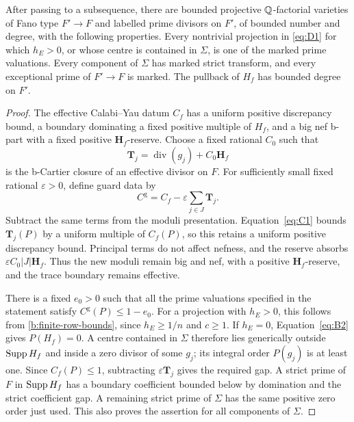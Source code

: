 \begin{lemma}\label{b:guard-model}
After passing to a subsequence, there are bounded projective
\(\mathbb Q\)-factorial varieties of Fano type \(F'\to F\) and labelled prime
divisors on \(F'\), of bounded number and degree, with the following
properties. Every nontrivial projection in \eqref{eq:D1} for which
\(h_E>0\), or whose centre is contained in \(\Sigma\), is one of the
marked prime valuations. Every component of \(\Sigma\) has marked strict
transform, and every exceptional prime of \(F'\to F\) is marked. The
pullback of \(H_f\) has bounded degree on \(F'\).
\end{lemma}

\begin{proof}
The effective Calabi--Yau datum \(C_f\) has a uniform positive discrepancy
bound, a boundary dominating a fixed positive multiple of \(H_f\), and a
big nef b-part with a fixed positive \(\mathbf H_f\)-reserve. Choose a
fixed rational \(C_0\) such that
\[
 \mathbf T_j=\operatorname{div}(g_j)+C_0\mathbf H_f
\]
is the b-Cartier closure of an effective divisor on \(F\). For sufficiently
small fixed rational \(\varepsilon>0\), define guard data by
\[
 C^{\mathrm g}=C_f-\varepsilon\sum_{j\in J}\mathbf T_j.
\]
Subtract the same terms from the moduli presentation. Equation~\eqref{eq:C1}
bounds \(\mathbf T_j(P)\) by a uniform multiple of \(C_f(P)\), so this
retains a uniform positive discrepancy bound. Principal terms do not affect
nefness, and the reserve absorbs \(\varepsilon C_0|J|\mathbf H_f\).
Thus the new moduli remain big and nef, with a positive
\(\mathbf H_f\)-reserve, and the trace boundary remains effective.

There is a fixed \(e_0>0\) such that all the prime valuations specified in
the statement satisfy \(C^{\mathrm g}(P)\leq1-e_0\). For a projection
with \(h_E>0\), this follows from \eqref{b:finite-row-bounds}, since
\(h_E\geq1/n\) and \(c\geq1\). If \(h_E=0\), Equation~\eqref{eq:B2}
gives \(P(H_f)=0\). A centre contained in \(\Sigma\) therefore lies
generically outside \(\operatorname{Supp} H_f\) and inside a zero divisor of some
\(g_j\); its integral order \(P(g_j)\) is at least one. Since
\(C_f(P)\leq1\), subtracting \(\varepsilon\mathbf T_j\) gives the
required gap. A strict prime of \(F\) in \(\operatorname{Supp} H_f\) has a boundary
coefficient bounded below by domination and the strict coefficient gap.
A remaining strict prime of \(\Sigma\) has the same positive zero order
just used. This also proves the assertion for all components of \(\Sigma\).


\end{proof}
